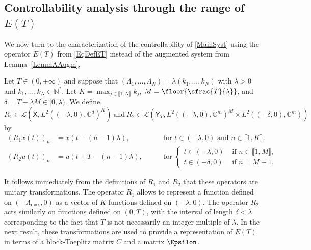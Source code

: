 \subsection{\texorpdfstring{Controllability analysis through the range of $E(T)$}{Controllability analysis through the range of E(T)}}

We now turn to the characterization of the controllability of \eqref{MainSyst} using the operator $E(T)$ from \eqref{EqDefET} instead of the augmented system from Lemma~\ref{LemmAAugm}.

\begin{defi}
\label{DefiR1R2}
Let $T \in (0, +\infty)$ and suppose that $(\Lambda_1, \dots, \Lambda_N) = \lambda (k_1, \dots, k_N)$ with $\lambda > 0$ and $k_1, \dots, k_N \in \mathbb N^\ast$. Let $K = \max_{j \in \llbracket 1, N\rrbracket} k_j$, $M = \floor{\sfrac{T}{\lambda}}$, and $\delta = T - \lambda M \in [0, \lambda)$. We define
\[
R_1 \in \mathcal L\left(\mathsf X, L^2((-\lambda, 0), \mathbb C^d)^K\right)\ \text{and}\ R_2 \in \mathcal L\left(\mathsf Y_T, L^2((-\lambda, 0), \mathbb C^m)^M \times L^2((-\delta, 0), \mathbb C^m)\right)
\]
by\vspace*{-3pt}
\[
\begin{aligned}
(R_1 x(t))_n & = x(t - (n-1)\lambda), & \quad & \text{ for } t \in (-\lambda, 0) \text{ and } n \in \llbracket 1, K\rrbracket, \\
(R_2 u(t))_n & = u(t + T - (n-1)\lambda), & & \text{ for } \left\{
\begin{aligned}
t \in (-\lambda, 0) & \text{ if } n \in \llbracket 1, M\rrbracket, \\
t \in (-\delta, 0) & \text{ if } n = M+1.
\end{aligned}\right.
\end{aligned}
\]
\end{defi}

It follows immediately from the definitions of $R_1$ and $R_2$ that these operators are unitary transformations. The operator $R_1$ allows to represent a function defined on $(-\Lambda_{\max}, 0)$ as a vector of $K$ functions defined on $(-\lambda, 0)$. The operator $R_2$ acts similarly on functions defined on $(0, T)$, with the interval of length $\delta < \lambda$ corresponding to the fact that $T$ is not necessarily an integer multiple of $\lambda$. In the next result, these transformations are used to provide a representation of $E(T)$ in terms of a block-Toeplitz matrix $C$ and a matrix $\Epsilon$.

